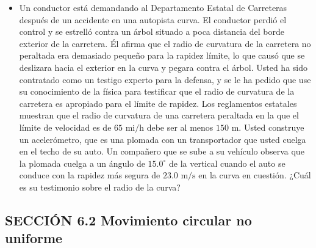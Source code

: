 \documentclass[11pt,a4paper]{article}
\begin{document}
\begin{itemize}
    \item[\textbf{8.}] Un conductor está demandando al Departamento Estatal de Carreteras después de un accidente en una autopista curva. El conductor perdió el control y se estrelló contra un árbol situado a poca distancia del borde exterior de la carretera. Él afirma que el radio de curvatura de la carretera no peraltada era demasiado pequeño para la rapidez límite, lo que causó que se deslizara hacia el exterior en la curva y pegara contra el árbol. Usted ha sido contratado como un testigo experto para la defensa, y se le ha pedido que use su conocimiento de la física para testificar que el radio de curvatura de la carretera es apropiado para el límite de rapidez. Los reglamentos estatales muestran que el radio de curvatura de una carretera peraltada en la que el límite de velocidad es de $65 \text{ mi/h}$ debe ser al menos $150 \text{ m}$. Usted construye un acelerómetro, que es una plomada con un transportador que usted cuelga en el techo de su auto. Un compañero que se sube a su vehículo observa que la plomada cuelga a un ángulo de $15.0^\circ$ de la vertical cuando el auto se conduce con la rapidez más segura de $23.0 \text{ m/s}$ en la curva en cuestión. ¿Cuál es su testimonio sobre el radio de la curva?
    \vspace*{7cm}
\end{itemize}

\newpage

\subsection*{SECCIÓN 6.2 Movimiento circular no uniforme}
\end{document}
